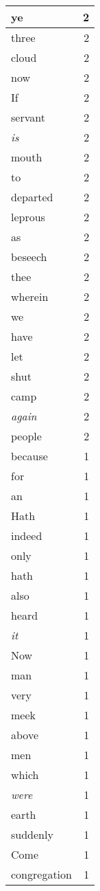 \begin{center}
\begin{longtable}{l|r}
ye & 2 \\ \hline
three & 2 \\ \hline
cloud & 2 \\ \hline
now & 2 \\ \hline
If & 2 \\ \hline
servant & 2 \\ \hline
\emph{is} & 2 \\ \hline
mouth & 2 \\ \hline
to & 2 \\ \hline
departed & 2 \\ \hline
leprous & 2 \\ \hline
as & 2 \\ \hline
beseech & 2 \\ \hline
thee & 2 \\ \hline
wherein & 2 \\ \hline
we & 2 \\ \hline
have & 2 \\ \hline
let & 2 \\ \hline
shut & 2 \\ \hline
camp & 2 \\ \hline
\emph{again} & 2 \\ \hline
people & 2 \\ \hline
because & 1 \\ \hline
for & 1 \\ \hline
an & 1 \\ \hline
Hath & 1 \\ \hline
indeed & 1 \\ \hline
only & 1 \\ \hline
hath & 1 \\ \hline
also & 1 \\ \hline
heard & 1 \\ \hline
\emph{it} & 1 \\ \hline
Now & 1 \\ \hline
man & 1 \\ \hline
very & 1 \\ \hline
meek & 1 \\ \hline
above & 1 \\ \hline
men & 1 \\ \hline
which & 1 \\ \hline
\emph{were} & 1 \\ \hline
earth & 1 \\ \hline
suddenly & 1 \\ \hline
Come & 1 \\ \hline
congregation & 1 \\ \hline

\end{longtable}
\end{center}
